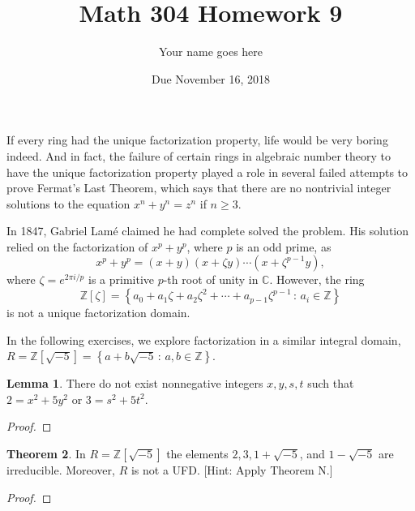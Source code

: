 \documentclass[11pt]{article}		%
\title{Math 304 Homework 9}
\author{Your name goes here}
\date{Due November 16, 2018}
\def\C{{\mathbb C}}
\def\Z{{\mathbb Z}}
\theoremstyle{definition}
\newtheorem{theorem}{Theorem}
\newtheorem{lemma}[theorem]{Lemma}
\def\setof#1#2{{\left\{#1\,\colon\,#2\right\}}}
\begin{document}
\maketitle

If every ring had the unique factorization property, life would be very boring indeed.
And in fact, the failure of certain rings in algebraic number theory to have the unique factorization property played a role in several failed attempts to prove Fermat's Last Theorem, which says that there are no nontrivial integer solutions to the equation $x^n + y^n = z^n$ if $n \ge 3$.

In 1847, Gabriel Lam\'{e} claimed he had complete solved the problem. His solution relied on the factorization of $x^p + y^p$, where $p$ is an odd prime, as
\[
	x^p + y^p = (x+y)(x+\zeta y) \cdots (x+\zeta^{p-1}y),
\]
where $\zeta = e^{2\pi i/p}$ is a primitive $p$-th root of unity in $\C$.
However, the ring 
\[
\Z[\zeta] = \setof{a_0 + a_1 \zeta + a_2 \zeta^2 + \cdots + a_{p-1} \zeta^{p-1}}{a_i\in\Z}
\]
is not a unique factorization domain.

In the following exercises, we explore factorization in a similar integral domain, $R = \Z[\sqrt{-5}] = \setof{a+b\sqrt{-5}}{a,b\in\Z}$.


\begin{lemma}
	There do not exist nonnegative integers $x, y, s, t$ such that $2 = x^2+5y^2$ or $3 = s^2 + 5 t^2$.
\end{lemma}

\begin{proof}

\end{proof}





\begin{theorem}
	In $R = \Z[\sqrt{-5}]$ the elements $2, 3, 1 + \sqrt{-5}$, and $1-\sqrt{-5}$ are irreducible.
	Moreover, $R$ is not a UFD.
	[Hint: Apply Theorem N.]
\end{theorem}


\begin{proof}

\end{proof} 
 
\end{document}
